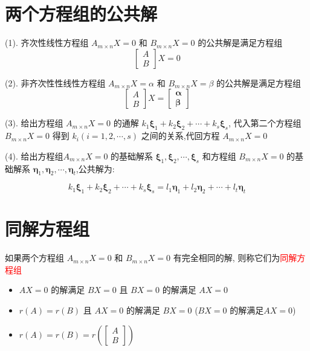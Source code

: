 \section{两个方程组的公共解}
\begin{definition}[两个方程组的公共解]
	(1). 齐次性线性方程组 $A_{m\times n}X=0$ 和 $B_{m\times n}X=0$ 的公共解是满足方程组 
	$$\begin{bmatrix}
		A\\B
	\end{bmatrix}X = 0$$
	
	(2). 非齐次性性线性方程组 $A_{m\times n}X=\alpha$ 和 $B_{m\times n}X=\beta$ 的公共解是满足方程组 
	$$\begin{bmatrix}
		A\\B
	\end{bmatrix} X = 
	\begin{bmatrix}
		\boldsymbol{\alpha}\\
		\boldsymbol{\beta}
	\end{bmatrix}$$
	
	(3). 给出方程组 $A_{m\times n}X=0$ 的通解 $k_{1}\boldsymbol{\xi}_{1} + k_{2}\boldsymbol{\xi}_{2} + \cdots + k_{s}\boldsymbol{\xi}_{s}$, 
	代入第二个方程组 $B_{m\times n}X=0$ 得到 $k_{i}(i = 1,2,\cdots,s)$ 之间的关系,代回方程 $A_{m\times n}X=0$
	
	(4). 给出方程组$A_{m\times n}X=0$ 的基础解系 $\boldsymbol{\xi}_{1},\boldsymbol{\xi}_{2},\cdots,\boldsymbol{\xi}_{s}$ 和方程组 $B_{m\times n}X=0$ 的基础解系
	$\boldsymbol{\eta}_{1},\boldsymbol{\eta}_{2},\cdots,\boldsymbol{\eta}_{t}$,公共解为:

	$$k_{1}\boldsymbol{\xi}_{1} + k_{2}\boldsymbol{\xi}_{2} + \cdots + k_{s}\boldsymbol{\xi}_{s} = l_{1}\boldsymbol{\eta}_{1} + l_{2}\boldsymbol{\eta}_{2} + \cdots + l_{t}\boldsymbol{\eta}_{t}$$
\end{definition}
\section{同解方程组}
\begin{definition}[同解方程组]
	如果两个方程组 $A_{m\times n}X=0$ 和 $B_{m\times n}X=0$ 有完全相同的解, 则称它们为\textcolor{red}{同解方程组}
	\begin{itemize}
		\item $AX=0$ 的解满足 $BX=0$ 且 $BX=0$ 的解满足 $AX=0$
		\item $r(A)=r(B)$ 且 $AX=0$ 的解满足 $BX=0$ ($BX=0$ 的解满足$AX=0$)
		\item $r(A)=r(B)=r(\begin{bmatrix}
		  A\\B
		\end{bmatrix})$
	\end{itemize}
\end{definition}



